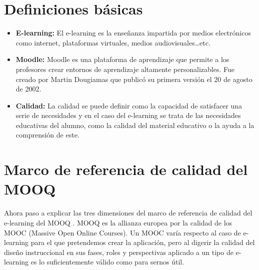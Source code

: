 

\section{Definiciones básicas}

\begin{itemize}
	\item \textbf{E-learning:}
	El e-learning es la enseñanza impartida por medios electrónicos como internet, plataformas virtuales, medios audiovisuales…etc.
	\item \textbf{Moodle:}
	Moodle es una plataforma de aprendizaje que permite a los profesores crear entornos de aprendizaje altamente personalizables. Fue creado por Martin Dougiamas que publicó su primera versión el 20 de agosto de 2002\cite{dougiamas2002interpretive}.
	\item \textbf{Calidad:}
	La calidad se puede definir como la capacidad de satisfacer una serie de necesidades y en el caso del e-learning se trata de las necesidades educativas del alumno, como la calidad del material educativo o la ayuda a la comprensión de este.
\end{itemize}

\section{Marco de referencia de calidad del MOOQ}
Ahora paso a explicar las tres dimensiones del marco de referencia de calidad del e-learning del MOOQ \cite{stracke2018quality}. MOOQ es la allianza europea por la calidad de los MOOC (Massive Open Online Courses). Un MOOC varía respecto al caso de e-learning para el que pretendemos crear la aplicación, pero al digerir la calidad del diseño instruccional en sus fases, roles y perspectivas aplicado a un tipo de e-learning es lo suficientemente válido como para sernos útil.

